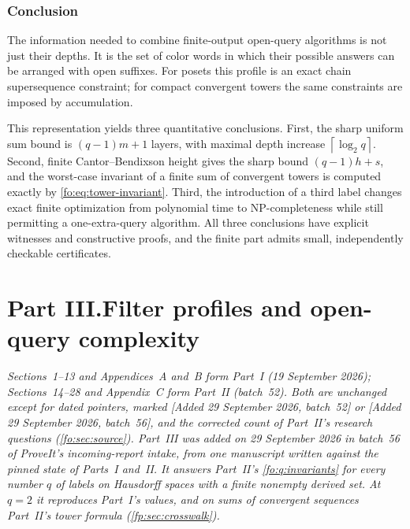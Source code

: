 \documentclass[11pt,letterpaper]{article}
\numberwithin{equation}{section}
\theoremstyle{definition}
\theoremstyle{remark}
\theoremstyle{definition}
\newcommand{\ceil}[1]{\left\lceil#1\right\rceil}
\begin{document}
\section{Conclusion}
The information needed to combine finite-output open-query algorithms is not
just their depths. It is the set of color words in which their possible answers
can be arranged with open suffixes. For posets this profile is an exact chain
supersequence constraint; for compact convergent towers the same constraints
are imposed by accumulation.

This representation yields three quantitative conclusions. First, the sharp
uniform sum bound is $(q-1)m+1$ layers, with maximal depth increase
$\ceil{\log_2q}$. Second, finite Cantor--Bendixson height gives the sharp bound
$(q-1)h+s$, and the worst-case invariant of a finite sum of convergent towers is
computed exactly by \eqref{fo:eq:tower-invariant}. Third, the introduction of a
third label changes exact finite optimization from polynomial time to
NP-completeness while still permitting a one-extra-query algorithm. All three
conclusions have explicit witnesses and constructive proofs, and the finite
part admits small, independently checkable certificates.

\clearpage
{}\part*{Part III.\quad Filter profiles and open-query complexity}

\noindent\emph{Sections~1--13 and Appendices~A and~B form Part~I (19 September
2026); Sections~14--28 and Appendix~C form Part~II (batch~52). Both are
unchanged except for dated pointers, marked \textup{[Added 29 September 2026,
batch~52]} or \textup{[Added 29 September 2026, batch~56]}, and the corrected
count of Part~II's research questions (\cref{fo:sec:source}). Part~III was
added on 29 September 2026 in batch~56 of ProveIt's incoming-report intake,
from one manuscript written against the pinned state of Parts~I and~II. It
answers Part~II's \cref{fo:q:invariants} for every number $q$ of labels on
Hausdorff spaces with a finite nonempty derived set. At $q=2$ it reproduces
Part~I's values, and on sums of convergent sequences Part~II's tower formula
(\cref{fp:sec:crosswalk}).}
\end{document}
